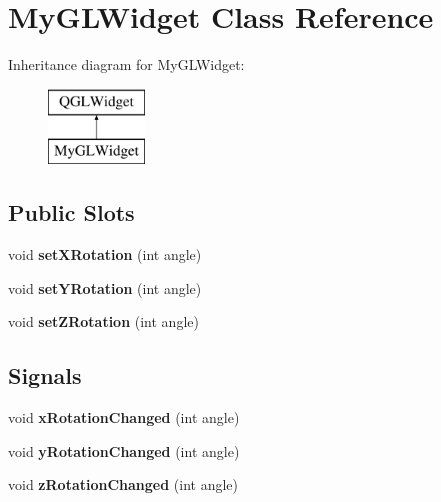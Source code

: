 \hypertarget{class_my_g_l_widget}{}\section{My\+G\+L\+Widget Class Reference}
\label{class_my_g_l_widget}
Inheritance diagram for My\+G\+L\+Widget\+:\begin{figure}[H]
\begin{center}
\leavevmode
\includegraphics[height=2.000000cm]{class_my_g_l_widget}
\end{center}
\end{figure}
\subsection*{Public Slots}
\begin{DoxyCompactItemize}
\item 
\mbox{\label{class_my_g_l_widget_ae25d0d92cce067011b007d2981a73cf5}} 
void {\bfseries set\+X\+Rotation} (int angle)
\item 
\mbox{\label{class_my_g_l_widget_abcd9fa6194011d563c281b723fdf5212}} 
void {\bfseries set\+Y\+Rotation} (int angle)
\item 
\mbox{\label{class_my_g_l_widget_aa54d51fa4a18e3fba20ceaa643bb2bea}} 
void {\bfseries set\+Z\+Rotation} (int angle)
\end{DoxyCompactItemize}
\subsection*{Signals}
\begin{DoxyCompactItemize}
\item 
\mbox{\label{class_my_g_l_widget_a4b68ba3a94f33acd2a7c6378b6e0d8c4}} 
void {\bfseries x\+Rotation\+Changed} (int angle)
\item 
\mbox{\label{class_my_g_l_widget_a6b8d69c457500f1d991b95f5e56c69c3}} 
void {\bfseries y\+Rotation\+Changed} (int angle)
\item 
\mbox{\label{class_my_g_l_widget_a29cd77996caf2a33c4d82c1b2a923689}} 
void {\bfseries z\+Rotation\+Changed} (int angle)
\end{DoxyCompactItemize}
